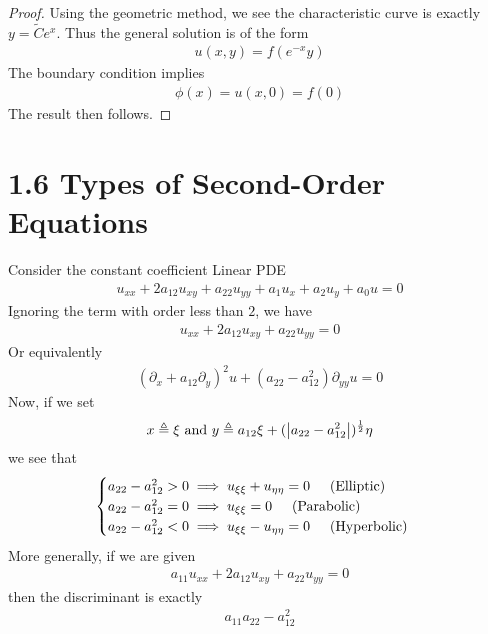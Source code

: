 \documentclass{report}
\begin{document}
\begin{proof}
Using the geometric method, we see the characteristic curve is exactly $y=\tilde{C}e^x$. Thus the general solution is of the form 
\begin{align*}
u(x,y)=f(e^{-x}y)
\end{align*}
The boundary condition implies 
\begin{align*}
\phi (x)=u(x,0)=f(0)
\end{align*}
The result then follows. 
\end{proof}
\section{1.6 Types of Second-Order Equations} 
\begin{mdframed}
Consider the constant coefficient Linear PDE 
\begin{align*}
u_{xx}+2a_{12}u_{xy}+a_{22}u_{yy}+a_1u_x+a_2u_y+a_0u=0 
\end{align*}
Ignoring the term with order less than $2$, we have 
\begin{align*}
u_{xx}+2a_{12}u_{xy}+a_{22}u_{yy}=0 
\end{align*}
Or equivalently 
\begin{align*}
  (\partial_x + a_{12}\partial_y)^2 u + ( a_{22}-a_{12}^2)\partial_{yy} u =0 
\end{align*}
Now, if we set  
\begin{align*}
x\triangleq \xi \text{ and }y\triangleq a_{12}\xi + (\left|a_{22}-a_{12}^2\right|)^{\frac{1}{2}}\eta 
\end{align*}
we see that 
\begin{align*}
\begin{cases}
  a_{22}-a_{12}^2>0 \implies u_{\xi \xi}+u_{\eta \eta  }=0 \hspace{0.5cm}(\text{Elliptic})\\
  a_{22}-a_{12}^2=0 \implies u_{\xi \xi}=0\hspace{0.5cm}(\text{Parabolic})\\
  a_{22}-a_{12}^2 < 0 \implies u_{\xi \xi}-u_{\eta \eta  }=0\hspace{0.5cm}(\text{Hyperbolic})
\end{cases}
\end{align*}
More generally, if we are given 
\begin{align*}
a_{11}u_{xx}+2a_{12}u_{xy}+a_{22}u_{yy}=0
\end{align*}
then the discriminant is exactly 
\begin{align*}
a_{11}a_{22}-a_{12}^2
\end{align*}
\end{mdframed}
\end{document}
